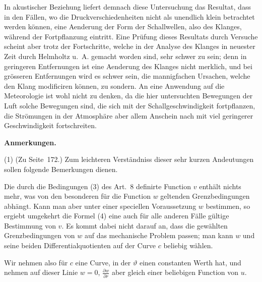 \documentclass[12pt,a4paper]{article}
\begin{document}
In akustischer Beziehung liefert demnach diese Untersuchung das Resultat, dass in den F\"allen, wo die Druckverschiedenheiten nicht als unendlich klein betrachtet werden k\"onnen, eine Aenderung der Form der Schallwellen, also des Klanges, w\"ahrend der Fortpflanzung eintritt. Eine Pr\"ufung dieses Resultats durch Versuche scheint aber trotz der Fortschritte, welche in der Analyse des Klanges in neuester Zeit durch Helmholtz u.~A. gemacht worden sind, sehr schwer zu sein; denn in geringeren Entfernungen ist eine Aenderung des Klanges nicht merklich, und bei gr\"osseren Entfernungen wird es schwer sein, die mannigfachen Ursachen, welche den Klang modificiren k\"onnen, zu sondern. An eine Anwendung auf die Meteorologie ist wohl nicht zu denken, da die hier untersuchten Bewegungen der Luft solche Bewegungen sind, die sich mit der Schallgeschwindigkeit fortpflanzen, die Str\"omungen in der Atmosph\"are aber allem Anschein nach mit viel geringerer Geschwindigkeit fortschreiten.

\newpage
\begin{center}
\Large\textbf{Anmerkungen.}
\end{center}

\smallskip
\noindent (1) (Zu Seite~172.) Zum leichteren Verst\"andniss dieser sehr kurzen Andeutungen sollen folgende Bemerkungen dienen.

Die durch die Bedingungen (3) des Art.~8 definirte Function $v$ enth\"alt nichts mehr, was von den besonderen f\"ur die Function $w$ geltenden Grenzbedingungen abh\"angt. Kann man aber unter einer speciellen Voraussetzung $w$ bestimmen, so ergiebt umgekehrt die Formel (4) eine auch f\"ur alle anderen F\"alle g\"ultige Bestimmung von $v$. Es kommt dabei nicht darauf an, dass die gew\"ahlten Grenzbedingungen von $w$ auf das mechanische Problem passen; man kann $w$ und seine beiden Differentialquotienten auf der Curve $c$ beliebig w\"ahlen.

Wir nehmen also f\"ur $c$ eine Curve, in der $\vartheta$ einen constanten Werth hat, und nehmen auf dieser Linie $w = 0$, $\frac{\partial w}{\partial r}$ aber gleich einer beliebigen Function von $u$.
\end{document}
